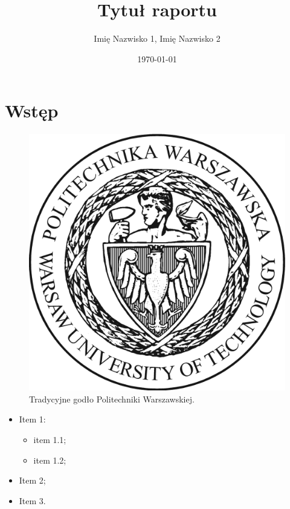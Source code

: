 \documentclass[
    hyphenation=true %
]{src/wut-report}
\begin{document}

\author{Imię Nazwisko 1, Imię Nazwisko 2}
\subject{Nazwa przedmiotu}
\title{Tytuł raportu}
\date{\today}
\maketitle

\leftheader{\theauthor}
\rightheader{\thesubject}


\section{Wstęp} \label{sec:intro}
\lipsum[1]

\begin{figure}[!h]
	\centering \includegraphics[width=0.4\linewidth]{img/logopw.png}
	\caption{Tradycyjne godło Politechniki Warszawskiej.}
	\label{fig:logo}
\end{figure}

\lipsum[2]

\begin{itemize}
    \item Item 1:
    \begin{itemize}[label=---]
        \item item 1.1;
        \item item 1.2;
    \end{itemize}
    \item Item 2;
    \item Item 3.
\end{itemize}
\end{document}
